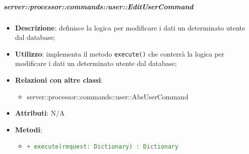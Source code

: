         \subparagraph{server::processor::commands::user::EditUserCommand} %
        \label{subp:bdsm_app_server_processor_commands_user_editusercommand}
        \begin{itemize}
          \item \textbf{Descrizione}: definisce la logica per modificare i dati un determinato utente dal database;
          \item \textbf{Utilizzo}: implementa il metodo \texttt{execute()} che conterrà la logica per modificare i dati un determinato utente dal database;
          \item \textbf{Relazioni con altre classi}:
            \begin{itemize}
              \item server::processor::commands::user::AbsUserCommand
            \end{itemize}
          \item \textbf{Attributi}: N/A
          \item \textbf{Metodi}:
          \begin{itemize}
              \item \textcolor{forestgreen}{\texttt{+ execute(request: Dictionary) : Dictionary}}
          \end{itemize}
        \end{itemize}

